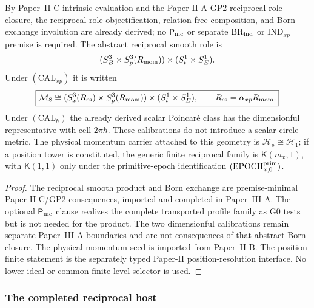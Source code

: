 \documentclass[12pt,a4paper]{article}
\begin{document}
\begin{theorem}
\label{p3:thm:phasespace}
By Paper~II-C intrinsic evaluation and the Paper-II-A GP2 reciprocal-role
closure, the reciprocal-role objectification, relation-free composition, and
Born exchange involution are already derived; no \(\mathsf P_{\rm mc}\) or separate
\(\mathrm{BR}_{\rm ind}\) or \(\mathrm{IND}_{xp}\) premise is required.
The abstract reciprocal smooth role is
\[
 (S^3_B\times S^3_p(R_{\mathrm{mom}}))\times(S^1_t\times S^1_E).
\]
Under \((\mathrm{CAL}_{xp})\) it is written
\[
 \boxed{\mathcal M_8\cong
 (S^3_x(R_{\mathrm{cs}})\times S^3_p(R_{\mathrm{mom}}))\times(S^1_t\times S^1_E),
 \qquad R_{\mathrm{cs}}=\alpha_{xp}R_{\mathrm{mom}}.}
\]
Under \((\mathrm{CAL}_{\hbar})\) the already derived scalar Poincar\'e class
has the dimensionful representative with cell \(2\pi\hbar\).  These
calibrations do not introduce a scalar-circle metric.  The physical momentum
carrier attached to this geometry is \(\mathcal H_p\cong\mathcal H_1\); if a
position tower is constituted, the generic finite reciprocal family is
\(\mathsf K(m_x,1)\), with \(\mathsf K(1,1)\) only under the primitive-epoch
identification \((\mathrm{EPOCH}_{x,0}^{\rm prim})\).
\end{theorem}

\begin{proof}
The reciprocal smooth product and Born exchange are premise-minimal
Paper-II-C/GP2 consequences, imported and completed in Paper~III-A.  The
optional \(\mathsf P_{\rm mc}\) clause realizes the complete transported
profile family as G0 tests but is not needed for the product.  The two
dimensionful calibrations remain separate Paper~III-A boundaries and are not
consequences of that abstract Born closure.  The physical momentum seed is imported
from Paper~II-B.  The position finite statement is the separately typed Paper-II
position-resolution interface.  No lower-ideal or common finite-level selector is used.
\end{proof}

\subsubsection{The completed reciprocal host}
\end{document}
